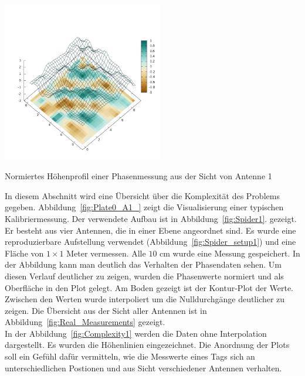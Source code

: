 %
\begin{floatingfigure}[hr!]{6cm}
 \centering
         \includegraphics[width=7cm]{img/Plate0_A1.png}
         \caption[Profil einer Phasenmessung]{Normiertes Höhenprofil einer Phasenmessung aus der Sicht von Antenne 1 }
         \label{fig:Plate0_A1_}
\end{floatingfigure}
%
In diesem Abschnitt wird eine Übersicht über die Komplexität des Problems gegeben. 
Abbildung~\ref{fig:Plate0_A1_} zeigt die Visualisierung einer typischen Kalibriermessung. Der verwendete Aufbau ist in Abbildung~\ref{fig:Spider1}. gezeigt. Er besteht aus vier Antennen, die in einer Ebene angeordnet sind. Es wurde eine reproduzierbare Aufstellung verwendet (Abbildung~\ref{fig:Spider_setup1}) und eine Fläche von $1\times1$ Meter vermessen. Alle $10$ cm wurde eine Messung gespeichert. In der Abbildung kann man deutlich das Verhalten der Phasendaten sehen. Um diesen Verlauf deutlicher zu zeigen, wurden die Phasenwerte normiert und als Oberfläche in den Plot gelegt. Am Boden gezeigt ist der Kontur-Plot der Werte. Zwischen den Werten wurde interpoliert um die Nulldurchgänge deutlicher zu zeigen. Die Übersicht aus der Sicht aller Antennen ist in Abbildung~\ref{fig:Real_Measurements} gezeigt.\\
%

In der Abbildung~\ref{fig:Complexity1} werden die Daten ohne Interpolation dargestellt. Es wurden die Höhenlinien eingezeichnet. Die Anordnung der Plots soll ein Gefühl dafür vermitteln, wie die Messwerte eines Tags sich an unterschiedlichen Postionen und aus Sicht verschiedener Antennen verhalten.\\
%

